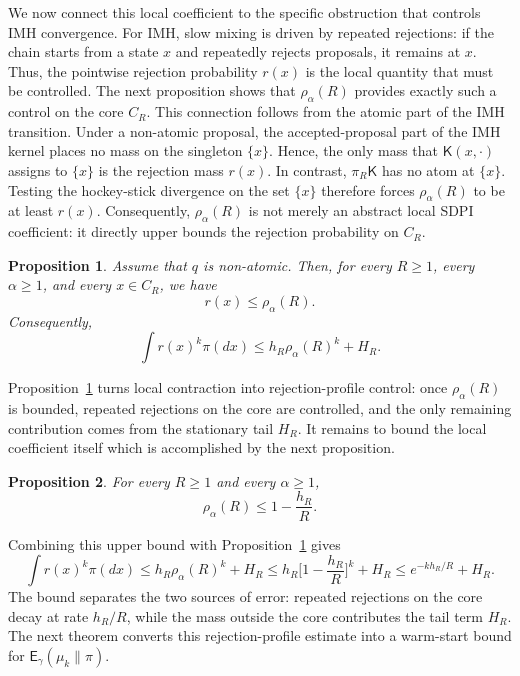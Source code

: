 \documentclass[10pt, journal]{IEEEtran}
\newcommand{\sK}{\mathsf{K}}
\newtheorem{proposition}{Proposition}
\begin{document}
We now connect this local coefficient to the specific obstruction that controls IMH convergence. For IMH, slow mixing is driven by repeated rejections: if the chain starts from a state $x$ and repeatedly rejects proposals, it remains at $x$. Thus, the pointwise rejection probability $r(x)$ is the local quantity that must be controlled. The next proposition shows that $\rho_\alpha(R)$ provides exactly such a control on the core $C_R$. This connection follows from the atomic part of the IMH transition. Under a non-atomic proposal, the accepted-proposal part of the IMH kernel places no mass on the singleton $\{x\}$. Hence, the only mass that $\sK(x,\cdot)$ assigns to $\{x\}$ is the rejection mass $r(x)$. In contrast, $\pi_R\sK$ has no atom at $\{x\}$. Testing the hockey-stick divergence on the set $\{x\}$ therefore forces $\rho_\alpha(R)$ to be at least $r(x)$. Consequently, $\rho_\alpha(R)$ is not merely an abstract local SDPI coefficient: it directly upper bounds the rejection probability on $C_R$.

\begin{proposition}
\label{prop:rho-controls-rejection}
Assume that $q$ is non-atomic. Then, for every $R\ge 1$, every $\alpha\ge 1$, and every $x\in C_R$, we have $$r(x)\le \rho_\alpha(R).$$
Consequently,
$$\int r(x)^k\pi(dx)\le h_R\rho_\alpha(R)^k+H_R.$$
\end{proposition}

Proposition~\ref{prop:rho-controls-rejection} turns local contraction into rejection-profile control: once $\rho_\alpha(R)$ is bounded, repeated rejections on the core are controlled, and the only remaining contribution comes from the stationary tail $H_R$. It remains to bound the local coefficient itself which is accomplished by the next proposition. 
\begin{proposition}
\label{prop:localSDPI_IMH}
For every $R\ge 1$ and every $\alpha\ge 1$,
$$\rho_\alpha(R)\le 1-\frac{h_R}{R}.$$
\end{proposition}


Combining this upper bound with Proposition~\ref{prop:rho-controls-rejection} gives
\begin{equation}\label{eq:rejectionSDPI}
    \int r(x)^k\pi(dx)\le h_R\rho_\alpha(R)^k+H_R\le h_R\Big[1-\frac{h_R}{R}\Big]^k+H_R\le e^{-kh_R/R}+H_R.
\end{equation}
The bound separates the two sources of error: repeated rejections on the core decay at rate $h_R/R$, while the mass outside the core contributes the tail term $H_R$. The next theorem converts this rejection-profile estimate into a warm-start bound for $\mathsf E_\gamma(\mu_k\|\pi)$.
\end{document}
